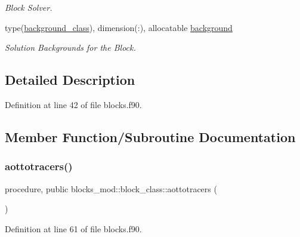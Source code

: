 \begin{DoxyCompactItemize}
\begin{DoxyCompactList}\small\item\em Block Solver. \end{DoxyCompactList}\item 
type(\mbox{\hyperlink{structbackground__mod_1_1background__class}{background\+\_\+class}}), dimension(\+:), allocatable \mbox{\hyperlink{structblocks__mod_1_1block__class_a774c07bf82d1392236abc81c285ea943}{background}}
\begin{DoxyCompactList}\small\item\em Solution Backgrounds for the Block. \end{DoxyCompactList}\end{DoxyCompactItemize}


\subsection{Detailed Description}


Definition at line 42 of file blocks.\+f90.



\subsection{Member Function/\+Subroutine Documentation}
\mbox{\label{structblocks__mod_1_1block__class_af7ee4536d72f1a114d9289c9e484f703}} 
\subsubsection{\texorpdfstring{aottotracers()}{aottotracers()}}
{\footnotesize\ttfamily procedure, public blocks\+\_\+mod\+::block\+\_\+class\+::aottotracers (\begin{DoxyParamCaption}{ }\end{DoxyParamCaption})}



Definition at line 61 of file blocks.\+f90.

\mbox{\label{structblocks__mod_1_1block__class_ad1d0f1aca1323fad86177deb0b818a51}} 
